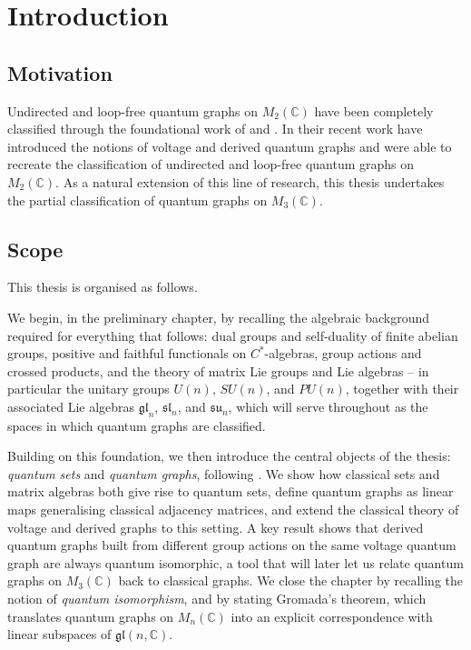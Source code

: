 \chapter{Introduction}

\section{Motivation}

Undirected and loop-free quantum graphs on \(M_2(\mathbb{C})\) have
been completely classified through the foundational work of
\textcite{matsuda22} and \textcite{gromada22}. In their
recent work \textcite{tobolski26} have introduced the notions of voltage and
derived quantum graphs and were able to recreate the classification of
undirected and loop-free quantum graphs on \( M_2 (\mathbb{C}) \).
As a natural extension of this line of research, this thesis
undertakes the partial classification of
quantum graphs on \(M_3(\mathbb{C})\).

\section{Scope}

This thesis is organised as follows.

We begin, in the preliminary chapter, by recalling the algebraic
background required for everything that follows: dual groups and
self-duality of finite abelian groups, positive and faithful
functionals on \( C^{*} \)-algebras, group actions and crossed
products, and the theory of matrix Lie groups and Lie algebras --
in particular the unitary groups \( U(n) \), \( SU(n) \), and
\( PU(n) \), together with their associated Lie algebras
\( \mathfrak{gl}_n \), \( \mathfrak{sl}_n \), and \( \mathfrak{su}_n \),
which will serve throughout as the spaces in which quantum graphs are
classified.

Building on this foundation, we then introduce the central objects of
the thesis: \emph{quantum sets} and \emph{quantum graphs}, following
\textcite{tobolski26}. We show how classical sets and matrix algebras
both give rise to quantum sets, define quantum graphs as linear maps
generalising classical adjacency matrices, and extend the classical
theory of voltage and derived graphs to this setting. A key result
shows that derived quantum graphs built from different group actions
on the same voltage quantum graph are always quantum isomorphic, a tool that
will later let us relate quantum graphs on \( M_{3}(\mathbb{C}) \)
back to classical
graphs. We close
the chapter by recalling the notion of \emph{quantum isomorphism}, and
by stating Gromada's theorem, which translates quantum graphs on
\( M_{n}(\mathbb{C}) \) into an explicit correspondence with linear subspaces of
\( \mathfrak{gl}(n, \mathbb{C}) \).

